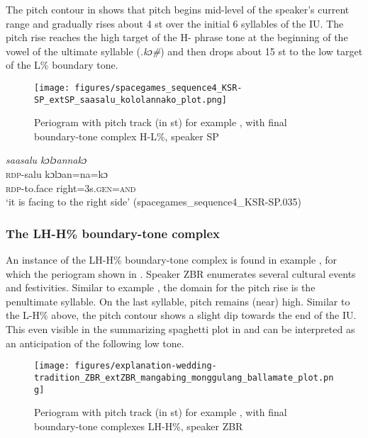 The pitch contour in   shows that pitch begins mid-level of the speaker’s current range and gradually rises about 4 st over the initial 6 syllables of the IU. The pitch rise reaches the high target  of the H- phrase tone at the beginning of the vowel of the ultimate syllable (\textit{.kɔ\#}) and then drops about 15 st to the low target of the L\% boundary tone. 





\begin{figure}
	\texttt{[image: figures/spacegames\_sequence4\_KSR-SP\_extSP\_saasalu\_kololannako\_plot.png]}
	\caption{Periogram with pitch track (in st) for example , with final boundary-tone complex H-L\%, speaker SP}
	\label{pitch_saasalu koloannako}
\end{figure}

\ea
\label{ex:saasalu koloannako}
\textit{saasalu kɔlɔannakɔ} \\
\gll \textsc{rdp-}salu kɔlɔan=na=kɔ \\
\textsc{rdp-}to.face right=3s\textsc{.gen}\textsc{=and}\\
\glt ‘it is facing to the right side’ \hfill(spacegames\_sequence4\_KSR-SP.035)
\z



\subsubsection{The LH-H\% boundary-tone complex}

An instance of the LH-H\% boundary-tone complex is found in example  , for which the periogram shown in  . Speaker ZBR enumerates several cultural events and festivities. Similar to example , the domain for the pitch rise is the penultimate syllable. On the last syllable, pitch remains (near) high. Similar to the L-H\% above, the pitch contour shows a slight dip towards the end of the IU. This even visible in the summarizing spaghetti plot in  	 and can be interpreted as an anticipation of the following low tone. 

\begin{figure}
	\texttt{[image: figures/explanation-wedding-tradition\_ZBR\_extZBR\_mangabing\_monggulang\_ballamate\_plot.png]}
	\caption{Periogram with pitch track (in st) for example , with final boundary-tone complexes LH-H\%, speaker ZBR}
	\label{pitch_ceremonies}
\end{figure}



